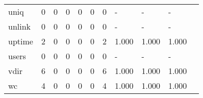 \begin{longtable}{lp{1.20cm}p{1.20cm}p{1.20cm}p{1.20cm}p{1.20cm}p{1.20cm}p{1.20cm}p{1.20cm}p{1.20cm}p{1.20cm}}
uniq      &                                     0 &                                                  0 &                                                  0 &                                                  0 &                                                  0 &                                                  0 &                                             - &                                                  - &                                                  - \\
unlink    &                                     0 &                                                  0 &                                                  0 &                                                  0 &                                                  0 &                                                  0 &                                             - &                                                  - &                                                  - \\
uptime    &                                     2 &                                                  0 &                                                  0 &                                                  0 &                                                  0 &                                                  2 &                                         1.000 &                                              1.000 &                                              1.000 \\
users     &                                     0 &                                                  0 &                                                  0 &                                                  0 &                                                  0 &                                                  0 &                                             - &                                                  - &                                                  - \\
vdir      &                                     6 &                                                  0 &                                                  0 &                                                  0 &                                                  0 &                                                  6 &                                         1.000 &                                              1.000 &                                              1.000 \\
wc        &                                     4 &                                                  0 &                                                  0 &                                                  0 &                                                  0 &                                                  4 &                                         1.000 &                                              1.000 &                                              1.000 \\

\end{longtable}
